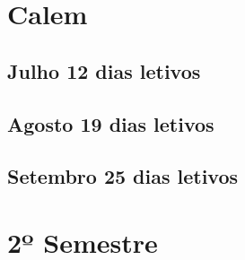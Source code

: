 \documentclass[thesis]{hmcposter}
\begin{document}
\begin{poster}
\section{\color{hmcorange}Calem}\subsection{Julho \hfill 12 dias letivos}\subsection{Agosto \hfill 19 dias letivos}\subsection{Setembro \hfill 25 dias letivos}\vfill\null
\columnbreak
\section{\hfill \color{hmcorange}2º Semestre}

\end{poster}
\end{document}
